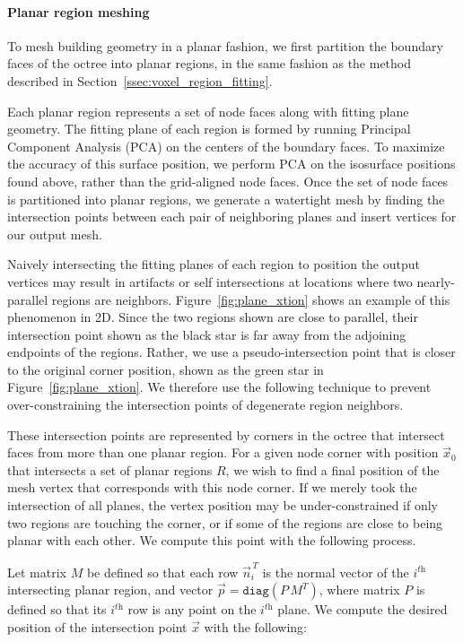 \documentclass[12pt,onecolumn,oneside]{book}
\begin{document}
\paragraph*{Planar region meshing}
To mesh building geometry in a planar fashion, we first partition the boundary faces of the octree into planar regions, in the same fashion as the method described in Section~\ref{ssec:voxel_region_fitting}.  

Each planar region represents a set of node faces along with fitting plane geometry.  The fitting plane of each region is formed by running Principal Component Analysis (PCA) on the centers of the boundary faces.  To maximize the accuracy of this surface position, we perform PCA on the isosurface positions found above, rather than the grid-aligned node faces.  Once the set of node faces is partitioned into planar regions, we generate a watertight mesh by finding the intersection points between each pair of neighboring planes and insert vertices for our output mesh.  

Naively intersecting the fitting planes of each region to position the output vertices may result in artifacts or self intersections at locations where two nearly-parallel regions are neighbors.  Figure~\ref{fig:plane_xtion} shows an example of this phenomenon in 2D.  Since the two regions shown are close to parallel, their intersection point shown as the black star is far away from the adjoining endpoints of the regions.  Rather, we use a pseudo-intersection point that is closer to the original corner position, shown as the green star in Figure~\ref{fig:plane_xtion}.  We therefore use the following technique to prevent over-constraining the intersection points of degenerate region neighbors.

These intersection points are represented by corners in the octree that intersect faces from more than one planar region.  For a given node corner with position $\vec{x}_0$ that intersects a set of planar regions $R$, we wish to find a final position of the mesh vertex that corresponds with this node corner.  If we merely took the intersection of all planes, the vertex position may be under-constrained if only two regions are touching the corner, or if some of the regions are close to being planar with each other.  
We compute this point with the following process.

Let matrix $M$ be defined so that each row $\vec{n}_i^{\,T}$ is the normal vector of the $i^{\textit{th}}$ intersecting planar region, and vector $\vec{p} = \texttt{diag}(P\,M^T)$, where matrix $P$ is defined so that its $i^{\textit{th}}$ row is any point on the $i^{\textit{th}}$ plane.  We compute the desired position of the intersection point $\vec{x}$ with the following:
\end{document}
